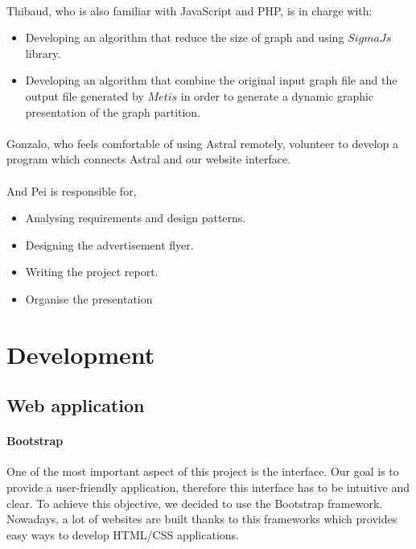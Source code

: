 \documentclass{cranfieldChart}
\begin{document}
\paragraph{}
Thibaud, who is also familiar with JavaScript and PHP, is in charge with: 
\begin{itemize}
    \item Developing an algorithm that reduce the size of graph and using $SigmaJs$ library.
    \item Developing an algorithm that combine the original input graph file and the output file generated by $Metis$ in order to generate a dynamic graphic presentation of the graph partition. 
\end{itemize}

\paragraph{}
Gonzalo, who feels comfortable of using Astral remotely, volunteer to develop a program which connects Astral and our website interface.

\paragraph{}
And Pei is responsible for, 
\begin{itemize}
    \item Analysing requirements and design patterns. 
    \item Designing the advertisement flyer.
    \item Writing  the project report.
    \item Organise the presentation 
\end{itemize}

\section{Development}

\subsection{Web application}

\paragraph{Bootstrap}
One of the most important aspect of this project is the interface. Our goal is to provide a user-friendly application, therefore this interface has to be intuitive and clear. To achieve this objective, we decided to use the Bootstrap framework. Nowadays, a lot of websites are built thanks to this frameworks which provides easy ways to develop HTML/CSS applications.
\end{document}
